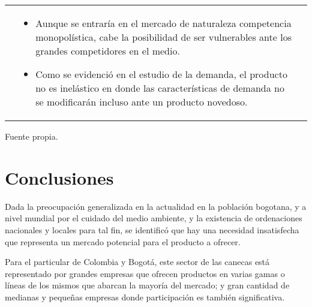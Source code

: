 \documentclass[letterpaper,12pt]{scrreprt}
\begin{document}
\begin{table}[H]
\begin{tabular}{|p{1.5cm}|p{7cm}|p{7cm}|}
{\begin{itemize}
    \end{itemize} } 
    &
    \parbox[p][0.4\textwidth][c]{7cm}{
    \begin{itemize}
        \item Aunque se entraría en el mercado de naturaleza competencia monopolística, cabe la posibilidad de ser vulnerables ante los grandes competidores en el medio.
        \item Como se evidenció en el estudio de la demanda, el producto no es inelástico en donde las características de demanda no se modificarán incluso ante un producto novedoso.
        
    \end{itemize} } 
    \\
    \hline
\end{tabular}
        \begin{flushright}
        \vspace{-0.3cm}
        {\scriptsize Fuente propia.} 
        \end{flushright}
        \end{table}



    \chapter{Conclusiones}
    
    Dada  la  preocupación  generalizada  en  la  actualidad en  la  población  bogotana,
    y a nivel mundial por  el  cuidado  del  medio ambiente,  y  la  existencia  de ordenaciones  nacionales  y  locales  para  tal  fin, 
    se identificó  que  hay  una  necesidad insatisfecha que representa un mercado potencial para el producto a ofrecer.
    
    Para  el  particular  de  Colombia  y  Bogotá, este sector de las canecas está representado por grandes empresas que ofrecen productos en varias gamas
    o líneas de los mismos que abarcan la mayoría del mercado; y gran cantidad de  medianas  y  pequeñas  empresas donde 
    participación es también significativa.
    
    
\end{document}
